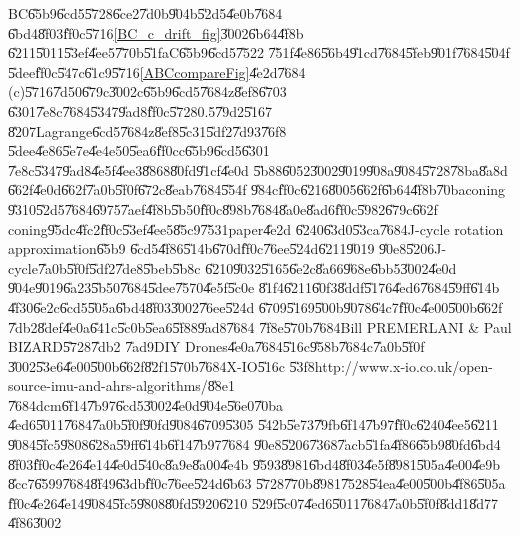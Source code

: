 \begin{case}
BC\U{65b9}\U{6cd5}\U{5728}\U{6ce2}\U{7d0b}\U{904b}\U{52d5}\U{4e0b}\U{7684}%
\U{6bd4}\U{8f03}\U{ff0c}\U{5716}\ref{BC_c_drift_fig}\U{3002}\U{6b64}\U{4f8b}%
\U{6211}\U{5011}\U{53ef}\U{4ee5}\U{770b}\U{51fa}C\U{65b9}\U{6cd5}\U{7522}%
\U{751f}\U{4e86}\U{56b4}\U{91cd}\U{7684}\U{5feb}\U{901f}\U{7684}\U{504f}%
\U{5dee}\U{ff0c}\U{547c}\U{61c9}\U{5716}\ref{ABCcompareFig}\U{4e2d}\U{7684}%
(c)\U{5716}\U{7d50}\U{679c}\U{3002}c\U{65b9}\U{6cd5}\U{7684}z\U{8ef8}\U{6703}%
\U{6301}\U{7e8c}\U{7684}\U{5347}\U{9ad8}\U{ff0c}\U{5728}0.5\U{79d2}\U{5167}%
\U{8207}Lagrange\U{6cd5}\U{7684}z\U{8ef8}\U{5c31}\U{5df2}\U{7d93}\U{76f8}%
\U{5dee}\U{4e86}\U{5e7e}\U{4e4e}50\U{5ea6}\U{ff0c}c\U{65b9}\U{6cd5}\U{6301}%
\U{7e8c}\U{5347}\U{9ad8}\U{4e5f}\U{4ee3}\U{8868}\U{80fd}\U{91cf}\U{4e0d}%
\U{5b88}\U{6052}\U{3002}\U{9019}\U{908a}\U{9084}\U{5728}\U{78ba}\U{8a8d}%
\U{662f}\U{4e0d}\U{662f}\U{7a0b}\U{5f0f}\U{672c}\U{8eab}\U{7684}\U{554f}%
\U{984c}\U{ff0c}\U{6216}\U{8005}\U{662f}\U{6b64}\U{4f8b}\U{70ba}coning%
\U{9310}\U{52d5}\U{7684}\U{6975}\U{7aef}\U{4f8b}\U{5b50}\U{ff0c}\U{898b}\cite%
[Page 23]{savage}\U{7684}\U{8a0e}\U{8ad6}\U{ff0c}\U{5982}\U{679c}\U{662f}%
coning\U{95dc}\U{4fc2}\U{ff0c}\U{53ef}\U{4ee5}\U{85c9}\U{7531}paper\U{4e2d}%
\U{6240}\U{63d0}\U{53ca}\U{7684}J-cycle rotation approximation\U{65b9}%
\U{6cd5}\U{4f86}\U{514b}\U{670d}\U{ff0c}\U{76ee}\U{524d}\U{6211}\U{9019}%
\U{90e8}\U{5206}J-cycle\U{7a0b}\U{5f0f}\U{5df2}\U{7de8}\U{5beb}\U{5b8c}%
\U{6210}\U{9032}\U{5165}\U{6e2c}\U{8a66}\U{968e}\U{6bb5}\U{3002}\U{4e0d}%
\U{904e}\U{9019}\U{6a23}\U{5b50}\U{7684}\U{5dee}\U{7570}\U{4e5f}\U{5c0e}%
\U{81f4}\U{6211}\U{60f3}\U{8ddf}\U{5176}\U{4ed6}\U{7684}\U{59ff}\U{614b}%
\U{4f30}\U{6e2c}\U{6cd5}\U{505a}\U{6bd4}\U{8f03}\U{3002}\U{76ee}\U{524d}%
\U{6709}\U{5169}\U{500b}\U{9078}\U{64c7}\U{ff0c}\U{4e00}\U{500b}\U{662f}%
\U{7db2}\U{8def}\U{4e0a}\U{641c}\U{5c0b}\U{5ea6}\U{5f88}\U{9ad8}\U{7684}%
\U{7f8e}\U{570b}\U{7684}Bill PREMERLANI \& Paul BIZARD\U{5728}\U{7db2}%
\U{7ad9}DIY Drones\U{4e0a}\U{7684}\U{516c}\U{958b}\U{7684}c\U{7a0b}\U{5f0f}%
\U{3002}\U{53e6}\U{4e00}\U{500b}\U{662f}\U{82f1}\U{570b}\U{7684}X-IO\U{516c}%
\U{53f8}http://www.x-io.co.uk/open-source-imu-and-ahrs-algorithms/\U{88e1}%
\U{7684}dcm\U{6f14}\U{7b97}\U{6cd5}\U{3002}\U{4e0d}\U{904e}\U{56e0}\U{70ba}%
\U{4ed6}\U{5011}\U{7684}\U{7a0b}\U{5f0f}\U{90fd}\U{9084}\U{6709}\U{5305}%
\U{542b}\U{5e73}\U{79fb}\U{6f14}\U{7b97}\U{ff0c}\U{6240}\U{4ee5}\U{6211}%
\U{9084}\U{5fc5}\U{9808}\U{628a}\U{59ff}\U{614b}\U{6f14}\U{7b97}\U{7684}%
\U{90e8}\U{5206}\U{7368}\U{7acb}\U{51fa}\U{4f86}\U{65b9}\U{80fd}\U{6bd4}%
\U{8f03}\U{ff0c}\U{4e26}\U{4e14}\U{4e0d}\U{540c}\U{8a9e}\U{8a00}\U{4e4b}%
\U{9593}\U{8981}\U{6bd4}\U{8f03}\U{4e5f}\U{8981}\U{505a}\U{4e00}\U{4e9b}%
\U{8cc7}\U{6599}\U{7684}\U{8f49}\U{63db}\U{ff0c}\U{76ee}\U{524d}\U{6b63}%
\U{5728}\U{770b}\U{8981}\U{7528}\U{54ea}\U{4e00}\U{500b}\U{4f86}\U{505a}%
\U{ff0c}\U{4e26}\U{4e14}\U{9084}\U{5fc5}\U{9808}\U{80fd}\U{5920}\U{6210}%
\U{529f}\U{5c07}\U{4ed6}\U{5011}\U{7684}\U{7a0b}\U{5f0f}\U{8dd1}\U{8d77}%
\U{4f86}\U{3002}
\end{case}

